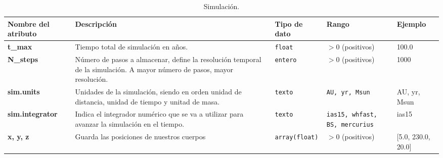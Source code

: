\begin{table}[H]
    \centering
    \caption{Simulación.}
    \label{tab:diccionario_simulación}
    \begin{adjustbox}{max width=\textwidth}
        \begin{tabular}{@{}p{4cm} p{5cm} p{2cm} p{2cm} p{3cm}@{}}
            \toprule
            \textbf{Nombre del atributo} & \textbf{Descripción} & \textbf{Tipo de dato} & \textbf{Rango} & \textbf{Ejemplo} \\
            \midrule
            \textbf{t\_max} & Tiempo total de simulación en años. & \texttt{float} & \( > 0 \) (positivos) & 100.0 \\
            \midrule
            \textbf{N\_steps} & Número de pasos a almacenar, define la resolución temporal de la simulación. A mayor número de pasos, mayor resolución. & \texttt{entero} & \(>0\) (positivos) & 1000 \\
            \midrule
            \textbf{sim.units} & Unidades de la simulación, siendo en orden unidad de distancia, unidad de tiempo y unitad de masa. & \texttt{texto} & \texttt{AU, yr, Msun} & AU, yr, Msun \\
            \midrule
            \textbf{sim.integrator} & Indica el integrador numérico que se va a utilizar para avanzar la simulación en el tiempo. & \texttt{texto} & \texttt{ias15, whfast, BS, mercurius}  & ias15 \\
            \midrule
            \textbf{x, y, z} & Guarda las posiciones de nuestros cuerpos & \texttt{array(float)} & \(>0\) (positivos) & [5.0, 230.0, 20.0]  \\
            \bottomrule
        \end{tabular}
    \end{adjustbox}
\end{table}

